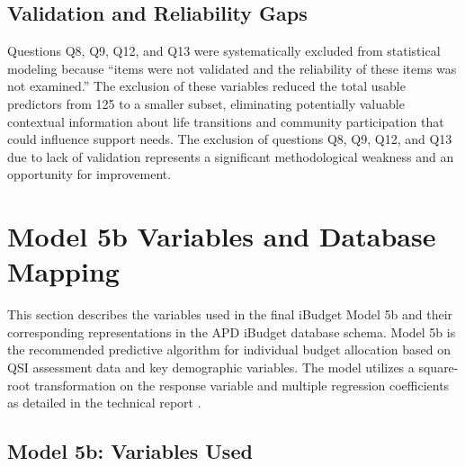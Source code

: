 \subsection{Validation and Reliability Gaps}
Questions Q8, Q9, Q12, and Q13 were systematically excluded from statistical modeling because ``items were not validated and the reliability of these items was not examined.'' The exclusion of these variables reduced the total usable predictors from 125 to a smaller subset, eliminating potentially valuable contextual information about life transitions and community participation that could influence support needs. The exclusion of questions Q8, Q9, Q12, and Q13 due to lack of validation represents a significant methodological weakness and an opportunity for improvement. 

\section{Model 5b Variables and Database Mapping}

This section describes the variables used in the final iBudget Model 5b and their corresponding representations in the APD iBudget database schema. Model 5b is the recommended predictive algorithm for individual budget allocation based on QSI assessment data and key demographic variables. The model utilizes a square-root transformation on the response variable and multiple regression coefficients as detailed in the technical report \cite{niu2015final}.

\subsection{Model 5b: Variables Used}

